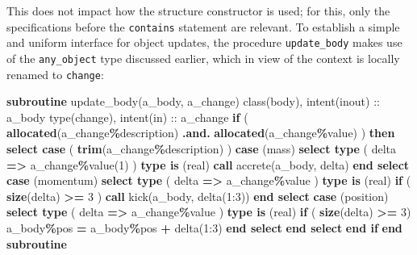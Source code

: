 \documentclass[
  paper=a4,
  ,captions=tableheading
]{scrartcl}
\newenvironment{Shaded}{\begin{snugshade}}{\end{snugshade}}
\newcommand{\DataTypeTok}[1]{\textcolor[rgb]{0.13,0.29,0.53}{#1}}
\newcommand{\DecValTok}[1]{\textcolor[rgb]{0.00,0.00,0.81}{#1}}
\newcommand{\FunctionTok}[1]{\textcolor[rgb]{0.13,0.29,0.53}{\textbf{#1}}}
\newcommand{\KeywordTok}[1]{\textcolor[rgb]{0.13,0.29,0.53}{\textbf{#1}}}
\newcommand{\NormalTok}[1]{#1}
\newcommand{\OperatorTok}[1]{\textcolor[rgb]{0.81,0.36,0.00}{\textbf{#1}}}
\newcommand{\StringTok}[1]{\textcolor[rgb]{0.31,0.60,0.02}{#1}}
\begin{document}
This does not impact how the structure constructor is used; for this,
only the specifications before the \texttt{contains} statement are
relevant. To establish a simple and uniform interface for object
updates, the procedure \texttt{update\_body} makes use of the
\texttt{any\_object} type discussed earlier, which in view of the
context is locally renamed to \texttt{change}:

\begin{Shaded}
\begin{Highlighting}[]
\KeywordTok{subroutine}\NormalTok{ update\_body(a\_body, a\_change)}
  \DataTypeTok{class(body)}\NormalTok{, }\DataTypeTok{intent(inout)} \DataTypeTok{::}\NormalTok{ a\_body}
  \DataTypeTok{type(change)}\NormalTok{, }\DataTypeTok{intent(in)} \DataTypeTok{::}\NormalTok{ a\_change}
  \KeywordTok{if}\NormalTok{ ( }\FunctionTok{allocated}\NormalTok{(a\_change}\OperatorTok{\%}\NormalTok{description) }\OperatorTok{.and.} \FunctionTok{allocated}\NormalTok{(a\_change}\OperatorTok{\%}\DataTypeTok{value}\NormalTok{) ) }\KeywordTok{then}
    \KeywordTok{select case}\NormalTok{ ( }\FunctionTok{trim}\NormalTok{(a\_change}\OperatorTok{\%}\NormalTok{description) )}
     \KeywordTok{case}\NormalTok{ (}\StringTok{\textquotesingle{}mass\textquotesingle{}}\NormalTok{)}
      \KeywordTok{select type}\NormalTok{ ( delta }\KeywordTok{=}\OperatorTok{\textgreater{}}\NormalTok{ a\_change}\OperatorTok{\%}\DataTypeTok{value}\NormalTok{(}\DecValTok{1}\NormalTok{) )}
       \KeywordTok{type is}\NormalTok{ (}\DataTypeTok{real}\NormalTok{)}
        \KeywordTok{call}\NormalTok{ accrete(a\_body, delta)}
      \KeywordTok{end select}
     \KeywordTok{case}\NormalTok{ (}\StringTok{\textquotesingle{}momentum\textquotesingle{}}\NormalTok{)}
      \KeywordTok{select type}\NormalTok{ ( delta }\KeywordTok{=}\OperatorTok{\textgreater{}}\NormalTok{ a\_change}\OperatorTok{\%}\DataTypeTok{value}\NormalTok{ )}
       \KeywordTok{type is}\NormalTok{ (}\DataTypeTok{real}\NormalTok{)}
        \KeywordTok{if}\NormalTok{ ( }\FunctionTok{size}\NormalTok{(delta) }\OperatorTok{\textgreater{}=} \DecValTok{3}\NormalTok{ ) }\KeywordTok{call}\NormalTok{ kick(a\_body, delta(}\DecValTok{1}\NormalTok{:}\DecValTok{3}\NormalTok{))}
      \KeywordTok{end select}
     \KeywordTok{case}\NormalTok{ (}\StringTok{\textquotesingle{}position\textquotesingle{}}\NormalTok{)}
      \KeywordTok{select type}\NormalTok{ ( delta }\KeywordTok{=}\OperatorTok{\textgreater{}}\NormalTok{ a\_change}\OperatorTok{\%}\DataTypeTok{value}\NormalTok{ )}
       \KeywordTok{type is}\NormalTok{ (}\DataTypeTok{real}\NormalTok{)}
        \KeywordTok{if}\NormalTok{ ( }\FunctionTok{size}\NormalTok{(delta) }\OperatorTok{\textgreater{}=} \DecValTok{3}\NormalTok{) a\_body}\OperatorTok{\%}\NormalTok{pos }\KeywordTok{=}\NormalTok{ a\_body}\OperatorTok{\%}\NormalTok{pos }\KeywordTok{+}\NormalTok{ delta(}\DecValTok{1}\NormalTok{:}\DecValTok{3}\NormalTok{)}
      \KeywordTok{end select}
    \KeywordTok{end select}
  \KeywordTok{end if}
\KeywordTok{end subroutine}
\end{Highlighting}
\end{Shaded}
\end{document}
